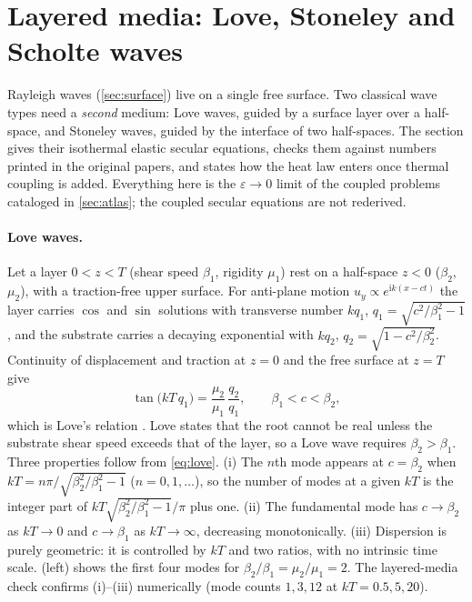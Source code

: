 \section{Layered media: Love, Stoneley and Scholte waves}\label{sec:layered}
Rayleigh waves (\cref{sec:surface}) live on a single free surface. Two classical wave types need a \emph{second} medium: Love waves, guided by a surface layer over a half-space, and Stoneley waves, guided by the interface of two half-spaces. The section gives their isothermal elastic secular equations, checks them against numbers printed in the original papers, and states how the heat law enters once thermal coupling is added. Everything here is the $\varepsilon\to0$ limit of the coupled problems cataloged in \cref{sec:atlas}; the coupled secular equations are not rederived.

\paragraph{Love waves.} Let a layer $0<z<T$ (shear speed $\beta_1$, rigidity $\mu_1$) rest on a half-space $z<0$ ($\beta_2$, $\mu_2$), with a traction-free upper surface. For anti-plane motion $u_y\propto e^{\mathrm i k(x-ct)}$ the layer carries $\cos$ and $\sin$ solutions with transverse number $kq_1$, $q_1=\sqrt{c^2/\beta_1^2-1}$, and the substrate carries a decaying exponential with $kq_2$, $q_2=\sqrt{1-c^2/\beta_2^2}$. Continuity of displacement and traction at $z=0$ and the free surface at $z=T$ give
\begin{equation}
\tan\!\big(kT\,q_1\big)=\frac{\mu_2}{\mu_1}\,\frac{q_2}{q_1},\qquad \beta_1<c<\beta_2 ,\label{eq:love}
\end{equation}
which is Love's relation \citep[eq.~(40), p.~162]{Love1911}. Love states that the root cannot be real unless the substrate shear speed exceeds that of the layer, so a Love wave requires $\beta_2>\beta_1$. Three properties follow from \eqref{eq:love}. (i) The $n$th mode appears at $c=\beta_2$ when $kT=n\pi/\sqrt{\beta_2^2/\beta_1^2-1}$ ($n=0,1,\dots$), so the number of modes at a given $kT$ is the integer part of $kT\sqrt{\beta_2^2/\beta_1^2-1}/\pi$ plus one. (ii) The fundamental mode has $c\to\beta_2$ as $kT\to0$ and $c\to\beta_1$ as $kT\to\infty$, decreasing monotonically. (iii) Dispersion is purely geometric: it is controlled by $kT$ and two ratios, with no intrinsic time scale. (left) shows the first four modes for $\beta_2/\beta_1=\mu_2/\mu_1=2$. The layered-media check confirms (i)--(iii) numerically (mode counts $1,3,12$ at $kT=0.5,5,20$).

